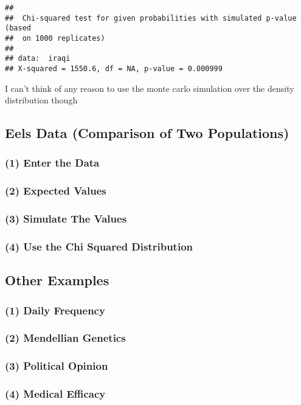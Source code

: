 \documentclass[
]{article}
\begin{document}
\begin{verbatim}
## 
##  Chi-squared test for given probabilities with simulated p-value (based
##  on 1000 replicates)
## 
## data:  iraqi
## X-squared = 1550.6, df = NA, p-value = 0.000999
\end{verbatim}

I can't think of any reason to use the monte carlo simulation over the
density distribution though

\hypertarget{eels-data-comparison-of-two-populations}{%
\subsection{Eels Data (Comparison of Two
Populations)}\label{eels-data-comparison-of-two-populations}}

\hypertarget{enter-the-data}{%
\subsubsection{(1) Enter the Data}\label{enter-the-data}}

\hypertarget{expected-values}{%
\subsubsection{(2) Expected Values}\label{expected-values}}

\hypertarget{simulate-the-values}{%
\subsubsection{(3) Simulate The Values}\label{simulate-the-values}}

\hypertarget{use-the-chi-squared-distribution}{%
\subsubsection{(4) Use the Chi Squared
Distribution}\label{use-the-chi-squared-distribution}}

\hypertarget{other-examples}{%
\subsection{Other Examples}\label{other-examples}}

\hypertarget{daily-frequency}{%
\subsubsection{(1) Daily Frequency}\label{daily-frequency}}

\hypertarget{mendellian-genetics}{%
\subsubsection{(2) Mendellian Genetics}\label{mendellian-genetics}}

\hypertarget{political-opinion}{%
\subsubsection{(3) Political Opinion}\label{political-opinion}}

\hypertarget{medical-efficacy}{%
\subsubsection{(4) Medical Efficacy}\label{medical-efficacy}}
\end{document}
